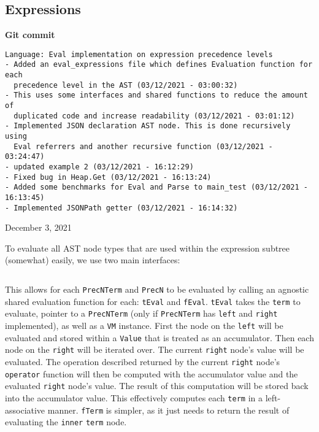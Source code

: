 \subsection{Expressions}
\label{sec:development-ast-nodes-expressions}

\begin{center}
    \textbf{Git commit}
    \begin{verbatim}
Language: Eval implementation on expression precedence levels
- Added an eval_expressions file which defines Evaluation function for each
  precedence level in the AST (03/12/2021 - 03:00:32)
- This uses some interfaces and shared functions to reduce the amount of
  duplicated code and increase readability (03/12/2021 - 03:01:12)
- Implemented JSON declaration AST node. This is done recursively using
  Eval referrers and another recursive function (03/12/2021 - 03:24:47)
- updated example 2 (03/12/2021 - 16:12:29)
- Fixed bug in Heap.Get (03/12/2021 - 16:13:24)
- Added some benchmarks for Eval and Parse to main_test (03/12/2021 - 16:13:45)
- Implemented JSONPath getter (03/12/2021 - 16:14:32)
    \end{verbatim}
    \vspace{-1em}
    \tiny{December 3, 2021}
\end{center}

To evaluate all AST node types that are used within the expression subtree (somewhat) easily, we use two main interfaces:

\inputminted[firstline=13, lastline=30, autogobble, breaklines, tabsize=4]{go}{../../src/parser/eval_expression.go}

This allows for each \verb|PrecNTerm| and \verb|PrecN| to be evaluated by calling an agnostic shared evaluation function for each: \verb|tEval| and \verb|fEval|. \verb|tEval| takes the \verb|term| to evaluate, pointer to a \verb|PrecNTerm| (only if \verb|PrecNTerm| has \verb|left| and \verb|right| implemented), as well as a \verb|VM| instance. First the node on the \verb|left| will be evaluated and stored within a \verb|Value| that is treated as an accumulator. Then each node on the \verb|right| will be iterated over. The current \verb|right| node's value will be evaluated. The operation described returned by the current \verb|right| node's \verb|operator| function will then be computed with the accumulator value and the evaluated \verb|right| node's value. The result of this computation will be stored back into the accumulator value. This effectively computes each \verb|term| in a left-associative manner. \verb|fTerm| is simpler, as it just needs to return the result of evaluating the \verb|inner| \verb|term| node.

